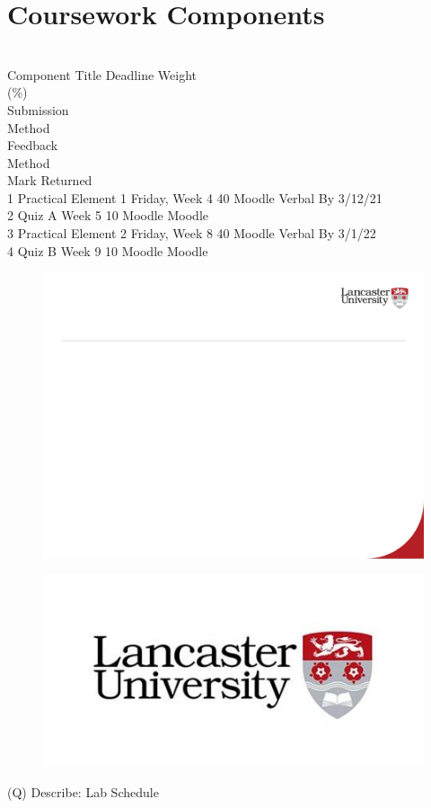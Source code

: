 \documentclass[12pt]{article}
\begin{document}
\section{Coursework Components}
\\
Component Title Deadline Weight \\
(\%)\\
Submission \\
Method\\
Feedback \\
Method\\
Mark Returned\\
1 Practical Element 1 Friday, Week 4 40 Moodle Verbal By 3/12/21\\
2 Quiz A Week 5 10 Moodle Moodle\\
3 Practical Element 2 Friday, Week 8 40 Moodle Verbal By 3/1/22\\
4 Quiz B Week 9 10 Moodle Moodle\\
\begin{figure}[H]
\includegraphics[width=0.5\linewidth]{page8-image-1.png}
\end{figure}
\begin{figure}[H]
\includegraphics[width=0.5\linewidth]{page8-image-2.png}
\end{figure}
\clearpage
(Q)
Describe: Lab Schedule
\clearpage
\end{document}
